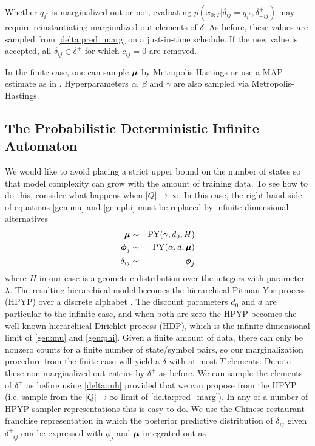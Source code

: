 Whether $q_{i^*}$ is marginalized out or not, evaluating $p(x_{0:T}|\delta_{ij}=q_{i^*},\delta_{-ij}^+)$ may require reinstantiating marginalized out elements of $\delta$.  As before, these values are sampled from \eqref{delta:pred_marg} on a just-in-time schedule.  If the new value is accepted, all $\delta_{ij} \in \delta^+$ for which $c_{ij} = 0$ are removed.

In the finite case, one can sample $\bmu$ by Metropolis-Hastings or use a MAP estimate as in \cite{Mackay1995}.  Hyperparameters $\alpha$, $\beta$ and $\gamma$ are also sampled via Metropolis-Hastings.
 
 \subsection{The Probabilistic Deterministic Infinite Automaton}
 
We would like to avoid placing a strict upper bound on the number of states so that model complexity can grow with the amount of training data.  To see how to do this, consider what happens when $|Q|\rightarrow\infty$.   In this case, the right hand side of equations \eqref{gen:mu} and \eqref{gen:phi} must be replaced by infinite dimensional alternatives
%
\begin{eqnarray*}
\bmu &\sim& \mathrm{PY}(\gamma,d_0,H)\\
\bphi_j &\sim& \mathrm{PY}(\alpha, d, \bmu) \\
\delta_{ij} &\sim& \bphi_j
\end{eqnarray*}
%  
where $H$ in our case is a geometric distribution over the integers with parameter $\lambda$.   The resulting hierarchical model becomes the hierarchical Pitman-Yor process (HPYP) over a discrete alphabet \cite{Teh2006}.  The discount parameters $d_0$ and $d$ are particular to the infinite case, and when both are zero the HPYP becomes the well known hierarchical Dirichlet process (HDP), which is the infinite dimensional limit of \eqref{gen:mu} and \eqref{gen:phi}.
Given a finite amount of data, there can only be nonzero counts for a finite number of state/symbol pairs, so our marginalization procedure from the finite case will yield a $\delta$ with at most $T$ elements.  Denote these non-marginalized out entries by $\delta^+$ as before.  We can sample the elements of $\delta^+$ as before using \eqref{delta:mh} provided that we can propose from the HPYP (i.e. sample from the  $|Q|\rightarrow\infty$ limit of \eqref{delta:pred_marg}).  In any of a number of HPYP sampler representations this is easy to do.  We use the Chinese restaurant franchise representation \cite{Teh2006} in which the posterior predictive distribution of $\delta_{ij}$ given $\delta_{-ij}^+$ can be expressed with $\phi_j$ and $\bmu$ integrated out as

